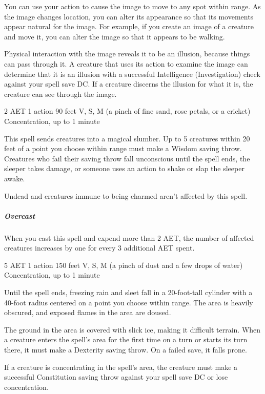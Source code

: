 You can use your action to cause the image to move to any spot within range. As the image changes location, you can alter its appearance so that its movements appear natural for the image. For example, if you create an image of a creature and move it, you can alter the image so that it appears to be walking.

Physical interaction with the image reveals it to be an illusion, because things can pass through it. A creature that uses its action to examine the image can determine that it is an illusion with a successful Intelligence (Investigation) check against your spell save DC. If a creature discerns the illusion for what it is, the creature can see through the image.

\label{spell:sleep}
{2 AET}
{1 action}
{90 feet}
{V, S, M (a pinch of fine sand, rose petals, or a cricket)}
{Concentration, up to 1 minute}

This spell sends creatures into a magical slumber. Up to 5 creatures within 20 feet of a point you choose within range must make a Wisdom saving throw. Creatures who fail their saving throw fall unconscious until the spell ends, the sleeper takes damage, or someone uses an action to shake or slap the sleeper awake.

Undead and creatures immune to being charmed aren't affected by this spell.

\subparagraph*{Overcast} When you cast this spell and expend more than 2 AET, the number of affected creatures increases by one for every 3 additional AET spent.

\label{spell:sleet-storm}
{5 AET}
{1 action}
{150 feet}
{V, S, M (a pinch of dust and a few drops of water)}
{Concentration, up to 1 minute}

Until the spell ends, freezing rain and sleet fall in a 20-foot-tall cylinder with a 40-foot radius centered on a point you choose within range. The area is heavily obscured, and exposed flames in the area are doused.

The ground in the area is covered with slick ice, making it difficult terrain. When a creature enters the spell's area for the first time on a turn or starts its turn there, it must make a Dexterity saving throw. On a failed save, it falls prone.

If a creature is concentrating in the spell's area, the creature must make a successful Constitution saving throw against your spell save DC or lose concentration.

